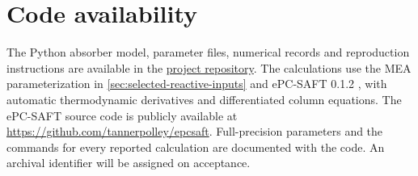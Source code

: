 \section*{Code availability}
The Python absorber model, parameter files, numerical records and reproduction instructions are available in the \href{https://github.com/tannerpolley/MEA-Absorption-Column}{project repository}.
The calculations use the MEA parameterization in \cref{sec:selected-reactive-inputs} and ePC-SAFT 0.1.2 \cite{polleyEPCSAFTElectrolyteEquationofstate2026}, with automatic thermodynamic derivatives and differentiated column equations.
The ePC-SAFT source code is publicly available at \url{https://github.com/tannerpolley/epcsaft}.
Full-precision parameters and the commands for every reported calculation are documented with the code.
An archival identifier will be assigned on acceptance.
